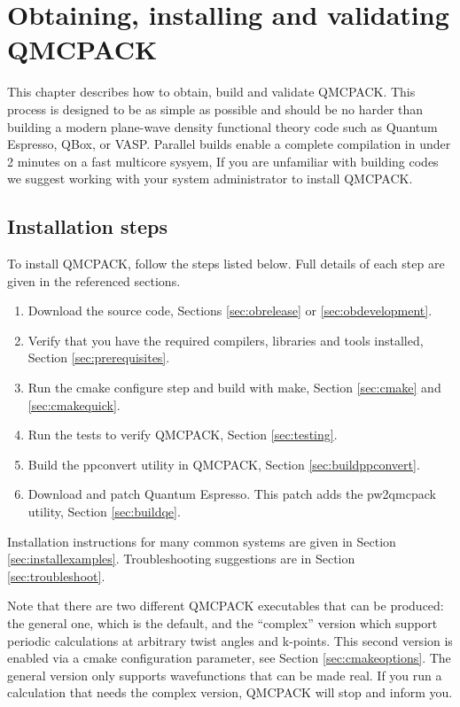\chapter{Obtaining, installing and validating QMCPACK}
\label{chap:obtaininginstalling}

This chapter describes how to obtain, build and validate QMCPACK. This process is designed to be as simple as
possible and should be no harder than building a modern plane-wave density
functional theory code such as Quantum Espresso, QBox, or
VASP. Parallel builds enable a complete
compilation in under 2 minutes on a fast multicore sysyem, If you
are unfamiliar with building codes we suggest working with your system
administrator to install QMCPACK.

\section{Installation steps}
To install QMCPACK, follow the steps listed below. Full details of
each step are given in the referenced sections.
\begin{enumerate}
\item Download the source code, Sections \ref{sec:obrelease} or \ref{sec:obdevelopment}.
\item Verify that you have the required compilers, libraries and tools
  installed, Section \ref{sec:prerequisites}.
\item Run the cmake configure step and build with make, Section
  \ref{sec:cmake} and \ref{sec:cmakequick}.
\item Run the tests to verify QMCPACK, Section \ref{sec:testing}.
\item Build the ppconvert utility in QMCPACK, Section \ref{sec:buildppconvert}.
\item Download and patch Quantum Espresso. This patch adds the
  pw2qmcpack utility, Section \ref{sec:buildqe}.
\end{enumerate}

Installation instructions for many common systems are given in Section
\ref{sec:installexamples}. Troubleshooting suggestions are in Section \ref{sec:troubleshoot}.

Note that there are two different QMCPACK executables that can be
produced: the general one, which is the default, and the ``complex''
version which support periodic calculations at arbitrary twist angles and
k-points. This second version is enabled via a cmake configuration
parameter, see Section \ref{sec:cmakeoptions}. The general version
only supports wavefunctions that can be made real. If you run a
calculation that needs the complex version, QMCPACK will stop and inform you.

